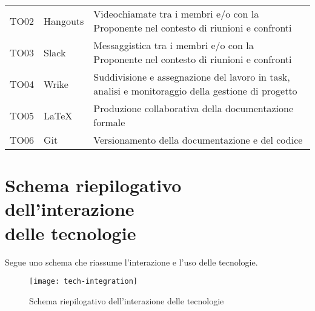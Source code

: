\documentclass[./../Technology Baseline.tex]{subfiles}
\begin{document}
\begin{longtable}{| p{2cm} | p{3.5cm} |p{7cm} |}
	\newline TO02&
	\newline Hangouts&
	\newline Videochiamate tra i membri e/o con la Proponente nel contesto di riunioni e confronti \newline
	\\[1em]
	
	\newline TO03&
	\newline Slack&
	\newline Messaggistica tra i membri e/o con la Proponente nel contesto di riunioni e confronti \newline
	\\[1em]
	
	\newline TO04&
	\newline Wrike&
	\newline Suddivisione e assegnazione del lavoro in task, analisi e monitoraggio della gestione di progetto \newline
	\\[1em]
	
	\newline TO05&
	\newline LaTeX&
	\newline Produzione collaborativa della documentazione formale \newline
	\\[1em]
	
	\newline TO06&
	\newline Git&
	\newline Versionamento della documentazione e del codice \newline
	\\[1em]
	\hline
\end{longtable}

\section{Schema riepilogativo dell'interazione \\ delle tecnologie}

Segue uno schema che riassume l'interazione e l'uso delle tecnologie.

\begin{figure}
	\texttt{[image: tech-integration]}
	\centering
	\caption{Schema riepilogativo dell'interazione delle tecnologie}
\end{figure}
\end{document}
